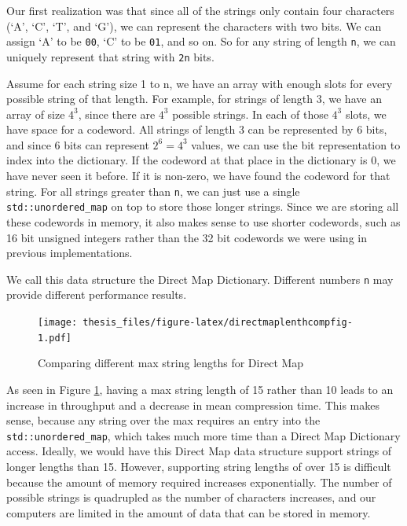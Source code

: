 \documentclass[12pt,twoside]{reedthesis}
\begin{document}
Our first realization was that since all of the strings only contain four characters (`A', `C', `T', and `G'), we can represent the characters with two bits. We can assign `A' to be \texttt{00}, `C' to be \texttt{01}, and so on. So for any string of length \texttt{n}, we can uniquely represent that string with \texttt{2n} bits.

Assume for each string size 1 to n, we have an array with enough slots for every possible string of that length. For example, for strings of length 3, we have an array of size \(4^3\), since there are \(4^3\) possible strings. In each of those \(4^3\) slots, we have space for a codeword. All strings of length 3 can be represented by 6 bits, and since 6 bits can represent \(2^6=4^3\) values, we can use the bit representation to index into the dictionary. If the codeword at that place in the dictionary is 0, we have never seen it before. If it is non-zero, we have found the codeword for that string. For all strings greater than \texttt{n}, we can just use a single \texttt{std::unordered\_map} on top to store those longer strings. Since we are storing all these codewords in memory, it also makes sense to use shorter codewords, such as 16 bit unsigned integers rather than the 32 bit codewords we were using in previous implementations.

We call this data structure the Direct Map Dictionary. Different numbers \texttt{n} may provide different performance results.
\begin{figure}
\centering
\texttt{[image: thesis\_files/figure-latex/directmaplenthcompfig-1.pdf]}
\caption{\label{fig:directmaplenthcompfig}Comparing different max string lengths for Direct Map}
\end{figure}
As seen in Figure \ref{fig:directmaplenthcompfig}, having a max string length of 15 rather than 10 leads to an increase in throughput and a decrease in mean compression time. This makes sense, because any string over the max requires an entry into the \texttt{std::unordered\_map}, which takes much more time than a Direct Map Dictionary access. Ideally, we would have this Direct Map data structure support strings of longer lengths than 15. However, supporting string lengths of over 15 is difficult because the amount of memory required increases exponentially. The number of possible strings is quadrupled as the number of characters increases, and our computers are limited in the amount of data that can be stored in memory.
\end{document}
